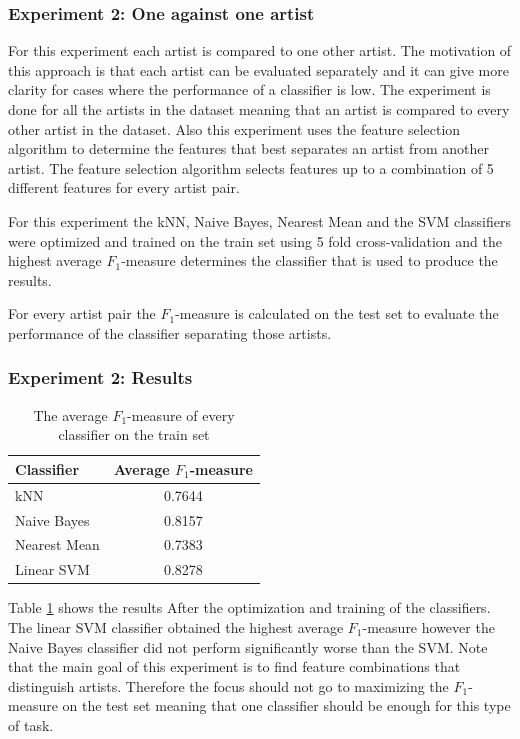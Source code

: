 \subsubsection{Experiment 2: One against one artist}

For this experiment each artist is compared to one other artist.
The motivation of this approach is that each artist can be evaluated separately and it can give more clarity for cases where the performance of a classifier is low.
The experiment is done for all the artists in the dataset meaning that an artist is compared to every other artist in the dataset.
Also this experiment uses the feature selection algorithm to determine the features that best separates an artist from another artist.
The feature selection algorithm selects features up to a combination of 5 different features for every artist pair.

For this experiment the kNN, Naive Bayes, Nearest Mean and the SVM classifiers were optimized and trained on the train set using 5 fold cross-validation and the highest average $F_1$-measure determines the classifier that is used to produce the results.

For every artist pair the $F_1$-measure is calculated on the test set to evaluate the performance of the classifier separating those artists.

\subsubsection{Experiment 2: Results}

\begin{table}[htb]
    \centering
    \begin{tabular}
        { | l | c |} 
        \hline
        Classifier & Average $F_1$-measure  \\
        \hline
        kNN & 0.7644 \\ 
        Naive Bayes & 0.8157 \\ 
        Nearest Mean & 0.7383 \\ 
        Linear SVM & 0.8278 \\ 
        \hline 
    \end{tabular}
    \caption{The average $F_1$-measure of every classifier on the train set}
    \label{ex2optimizeresults}
\end{table}

Table \ref{ex2optimizeresults} shows the results After the optimization and training of the classifiers.
The linear SVM classifier obtained the highest average $F_1$-measure however the Naive Bayes classifier did not perform significantly worse than the SVM.
Note that the main goal of this experiment is to find feature combinations that distinguish artists.
Therefore the focus should not go to maximizing the $F_1$-measure on the test set meaning that one classifier should be enough for this type of task.

